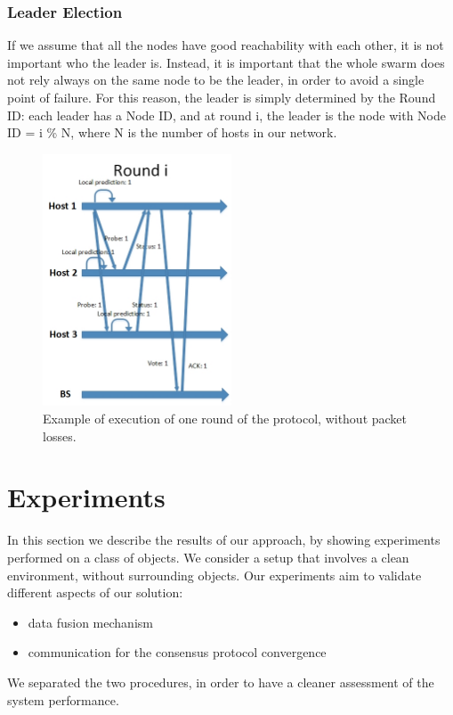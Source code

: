 \documentclass[10pt,conference,compsocconf]{IEEEtran}
\begin{document}
\begin{enumerate}
\subsubsection*{Leader Election}
If we assume that all the nodes have good reachability with each other, it is not important who the leader is. Instead, it is important that the whole swarm does not rely always on the same node to be the leader, in order to avoid a single point of failure. For this reason, the leader is simply determined by the Round ID: each leader has a Node ID, and at round i, the leader is the node with Node ID = i \% N, where N is the number of hosts in our network.
\begin{figure}
	\centering
	\includegraphics[width=0.5\textwidth]{img/temporal_sketch_NEW.jpg}
	\caption {Example of execution of one round of the protocol, without packet losses.}
	\label{fig:temporal_sketch}
\end{figure}
\section{Experiments}
In this section we describe the results of our approach, by showing experiments performed on a class of objects.
We consider a setup that involves a clean environment, without surrounding objects.
Our experiments aim to validate different aspects of our solution:
\begin{itemize}
\item data fusion mechanism
\item communication for the consensus protocol convergence
\end{itemize}
We separated the two procedures, in order to have a cleaner assessment of the system performance.

\end{enumerate}
\end{document}
